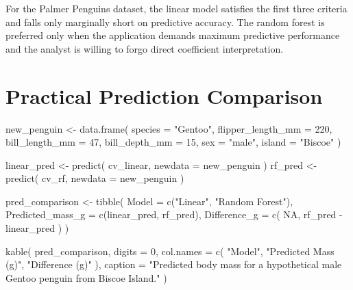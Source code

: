\documentclass[
  letterpaper,
  DIV=11,
  numbers=noendperiod]{scrartcl}
\newenvironment{Shaded}{\begin{snugshade}}{\end{snugshade}}
\newcommand{\AttributeTok}[1]{\textcolor[rgb]{0.40,0.45,0.13}{#1}}
\newcommand{\ConstantTok}[1]{\textcolor[rgb]{0.56,0.35,0.01}{#1}}
\newcommand{\DecValTok}[1]{\textcolor[rgb]{0.68,0.00,0.00}{#1}}
\newcommand{\FunctionTok}[1]{\textcolor[rgb]{0.28,0.35,0.67}{#1}}
\newcommand{\NormalTok}[1]{\textcolor[rgb]{0.00,0.23,0.31}{#1}}
\newcommand{\OtherTok}[1]{\textcolor[rgb]{0.00,0.23,0.31}{#1}}
\newcommand{\SpecialCharTok}[1]{\textcolor[rgb]{0.37,0.37,0.37}{#1}}
\newcommand{\StringTok}[1]{\textcolor[rgb]{0.13,0.47,0.30}{#1}}
\begin{document}
For the Palmer Penguins dataset, the linear model satisfies the first
three criteria and falls only marginally short on predictive accuracy.
The random forest is preferred only when the application demands maximum
predictive performance and the analyst is willing to forgo direct
coefficient interpretation.

\section{Practical Prediction
Comparison}\label{practical-prediction-comparison}

\begin{Shaded}
\begin{Highlighting}[]
\NormalTok{new\_penguin }\OtherTok{\textless{}{-}} \FunctionTok{data.frame}\NormalTok{(}
  \AttributeTok{species =} \StringTok{"Gentoo"}\NormalTok{,}
  \AttributeTok{flipper\_length\_mm =} \DecValTok{220}\NormalTok{,}
  \AttributeTok{bill\_length\_mm =} \DecValTok{47}\NormalTok{,}
  \AttributeTok{bill\_depth\_mm =} \DecValTok{15}\NormalTok{,}
  \AttributeTok{sex =} \StringTok{"male"}\NormalTok{,}
  \AttributeTok{island =} \StringTok{"Biscoe"}
\NormalTok{)}

\NormalTok{linear\_pred }\OtherTok{\textless{}{-}} \FunctionTok{predict}\NormalTok{(}
\NormalTok{  cv\_linear, }\AttributeTok{newdata =}\NormalTok{ new\_penguin}
\NormalTok{)}
\NormalTok{rf\_pred }\OtherTok{\textless{}{-}} \FunctionTok{predict}\NormalTok{(}
\NormalTok{  cv\_rf, }\AttributeTok{newdata =}\NormalTok{ new\_penguin}
\NormalTok{)}

\NormalTok{pred\_comparison }\OtherTok{\textless{}{-}} \FunctionTok{tibble}\NormalTok{(}
  \AttributeTok{Model =} \FunctionTok{c}\NormalTok{(}\StringTok{"Linear"}\NormalTok{, }\StringTok{"Random Forest"}\NormalTok{),}
  \AttributeTok{Predicted\_mass\_g =} \FunctionTok{c}\NormalTok{(linear\_pred, rf\_pred),}
  \AttributeTok{Difference\_g =} \FunctionTok{c}\NormalTok{(}
    \ConstantTok{NA}\NormalTok{, rf\_pred }\SpecialCharTok{{-}}\NormalTok{ linear\_pred}
\NormalTok{  )}
\NormalTok{)}

\FunctionTok{kable}\NormalTok{(}
\NormalTok{  pred\_comparison,}
  \AttributeTok{digits =} \DecValTok{0}\NormalTok{,}
  \AttributeTok{col.names =} \FunctionTok{c}\NormalTok{(}
    \StringTok{"Model"}\NormalTok{, }\StringTok{"Predicted Mass (g)"}\NormalTok{, }\StringTok{"Difference (g)"}
\NormalTok{  ),}
  \AttributeTok{caption =} \StringTok{"Predicted body mass for a hypothetical}
\StringTok{    male Gentoo penguin from Biscoe Island."}
\NormalTok{)}
\end{Highlighting}
\end{Shaded}
\end{document}
